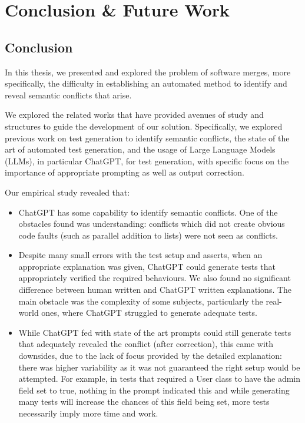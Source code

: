 \chapter{Conclusion \& Future Work}\label{chap:conclusion}

\section{Conclusion}

In this thesis, we presented and explored the problem of software merges, more specifically, the difficulty in establishing an automated method to identify and reveal semantic conflicts that arise.

We explored the related works that have provided avenues of study and structures to guide the development of our solution. Specifically, we explored previous work on test generation to identify semantic conflicts, the state of the art of automated test generation, and the usage of Large Language Models (LLMs), in particular ChatGPT, for test generation, with specific focus on the importance of appropriate prompting as well as output correction.

Our empirical study revealed that:
%
\begin{itemize}
  \item %
  ChatGPT has some capability to identify semantic conflicts. One of the obstacles found was understanding:
conflicts which did not create obvious code faults (such as parallel addition to lists) were not seen as conflicts. 

  \item %
  Despite many small errors with the test setup and asserts, when an appropriate explanation was given, ChatGPT could generate
tests that appropriately verified the required behaviours. We also found no significant difference between human written and ChatGPT written explanations. The main obstacle
was the complexity of some subjects, particularly the real-world ones, where ChatGPT struggled to generate adequate tests.

  \item %
  While ChatGPT fed with state of the art prompts could still generate tests that adequately revealed the conflict (after correction),
this came with downsides, due to the lack of focus provided by the detailed explanation: there was higher variability as it was not guaranteed the right setup would be attempted.
For example, in tests that required a User class to have the admin field set to true, nothing in the prompt indicated this and while generating many tests will increase the chances
of this field being set, more tests necessarily imply more time and work.
\end{itemize}

